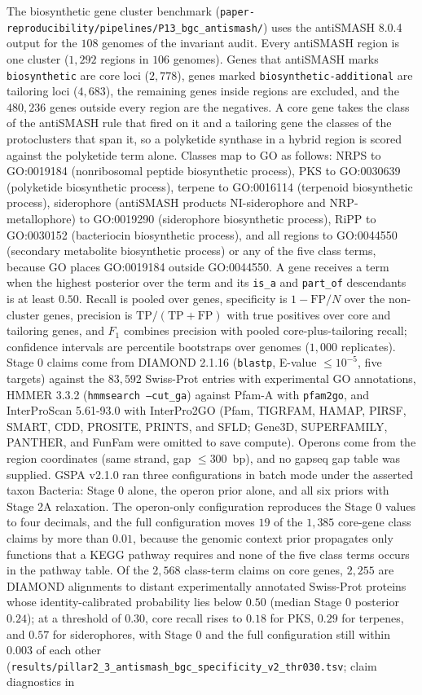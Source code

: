 \documentclass[10pt]{article}
\newcommand{\fn}[1]{\nolinkurl{#1}}
\begin{document}
The biosynthetic gene cluster benchmark (\fn{paper-reproducibility/pipelines/P13_bgc_antismash/}) uses the antiSMASH 8.0.4 output for the $108$ genomes of the invariant audit. Every antiSMASH region is one cluster ($1{,}292$ regions in $106$ genomes). Genes that antiSMASH marks \texttt{biosynthetic} are core loci ($2{,}778$), genes marked \texttt{biosynthetic-additional} are tailoring loci ($4{,}683$), the remaining genes inside regions are excluded, and the $480{,}236$ genes outside every region are the negatives. A core gene takes the class of the antiSMASH rule that fired on it and a tailoring gene the classes of the protoclusters that span it, so a polyketide synthase in a hybrid region is scored against the polyketide term alone. Classes map to GO as follows: NRPS to GO:0019184 (nonribosomal peptide biosynthetic process), PKS to GO:0030639 (polyketide biosynthetic process), terpene to GO:0016114 (terpenoid biosynthetic process), siderophore (antiSMASH products NI-siderophore and NRP-metallophore) to GO:0019290 (siderophore biosynthetic process), RiPP to GO:0030152 (bacteriocin biosynthetic process), and all regions to GO:0044550 (secondary metabolite biosynthetic process) or any of the five class terms, because GO places GO:0019184 outside GO:0044550. A gene receives a term when the highest posterior over the term and its \texttt{is\_a} and \texttt{part\_of} descendants is at least $0.50$. Recall is pooled over genes, specificity is $1 - \mathrm{FP}/N$ over the non-cluster genes, precision is $\mathrm{TP}/(\mathrm{TP}+\mathrm{FP})$ with true positives over core and tailoring genes, and $F_1$ combines precision with pooled core-plus-tailoring recall; confidence intervals are percentile bootstraps over genomes ($1{,}000$ replicates). Stage 0 claims come from DIAMOND 2.1.16 (\texttt{blastp}, E-value $\le 10^{-5}$, five targets) against the $83{,}592$ Swiss-Prot entries with experimental GO annotations, HMMER 3.3.2 (\texttt{hmmsearch --cut\_ga}) against Pfam-A with \texttt{pfam2go}, and InterProScan 5.61-93.0 with InterPro2GO (Pfam, TIGRFAM, HAMAP, PIRSF, SMART, CDD, PROSITE, PRINTS, and SFLD; Gene3D, SUPERFAMILY, PANTHER, and FunFam were omitted to save compute). Operons come from the region coordinates (same strand, gap $\le 300$~bp), and no gapseq gap table was supplied. GSPA v2.1.0 ran three configurations in batch mode under the asserted taxon Bacteria: Stage 0 alone, the operon prior alone, and all six priors with Stage 2A relaxation. The operon-only configuration reproduces the Stage 0 values to four decimals, and the full configuration moves $19$ of the $1{,}385$ core-gene class claims by more than $0.01$, because the genomic context prior propagates only functions that a KEGG pathway requires and none of the five class terms occurs in the pathway table. Of the $2{,}568$ class-term claims on core genes, $2{,}255$ are DIAMOND alignments to distant experimentally annotated Swiss-Prot proteins whose identity-calibrated probability lies below $0.50$ (median Stage 0 posterior $0.24$); at a threshold of $0.30$, core recall rises to $0.18$ for PKS, $0.29$ for terpenes, and $0.57$ for siderophores, with Stage 0 and the full configuration still within $0.003$ of each other (\fn{results/pillar2_3_antismash_bgc_specificity_v2_thr030.tsv}; claim diagnostics in 
\end{document}
